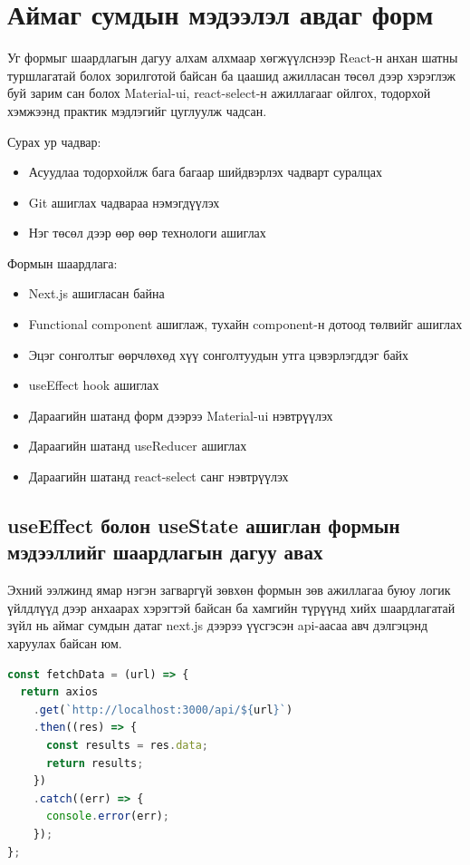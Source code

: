 \section{Аймаг сумдын мэдээлэл авдаг форм}

Уг формыг шаардлагын дагуу алхам алхмаар хөгжүүлснээр React-н анхан шатны туршлагатай болох зорилготой байсан ба цаашид ажилласан төсөл дээр хэрэглэж буй зарим сан болох Material-ui, react-select-н ажиллагааг ойлгох, тодорхой хэмжээнд практик мэдлэгийг цуглуулж чадсан. 

Сурах ур чадвар: 
\begin{itemize}
    \item Асуудлаа тодорхойлж бага багаар шийдвэрлэх чадварт суралцах
    \item Git ашиглах чадвараа нэмэгдүүлэх
    \item Нэг төсөл дээр өөр өөр технологи ашиглах
\end{itemize}

Формын шаардлага: 
\begin{itemize}
    \item Next.js ашигласан байна
    \item Functional component ашиглаж, тухайн component-н дотоод төлвийг ашиглах
    \item Эцэг сонголтыг өөрчлөхөд хүү сонголтуудын утга цэвэрлэгддэг байх
    \item useEffect hook ашиглах
    \item Дараагийн шатанд форм дээрээ Material-ui нэвтрүүлэх
    \item Дараагийн шатанд useReducer ашиглах
    \item Дараагийн шатанд react-select санг нэвтрүүлэх
\end{itemize}

\subsection{useEffect болон useState ашиглан формын мэдээллийг шаардлагын дагуу авах}

Эхний ээлжинд ямар нэгэн загваргүй зөвхөн формын зөв ажиллагаа буюу логик үйлдлүүд дээр анхаарах хэрэгтэй байсан ба хамгийн түрүүнд хийх шаардлагатай зүйл нь аймаг сумдын датаг next.js дээрээ үүсгэсэн api-аасаа авч дэлгэцэнд харуулах байсан юм. 

\begin{lstlisting}[language=Javascript, caption=Next.js дээр бичсэн серверээс датагаа татаж авах, frame=single]
const fetchData = (url) => {
  return axios
    .get(`http://localhost:3000/api/${url}`)
    .then((res) => {
      const results = res.data;
      return results;
    })
    .catch((err) => {
      console.error(err);
    });
};
\end{lstlisting}

